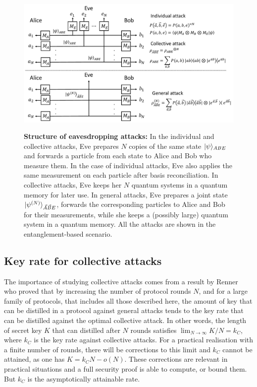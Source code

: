 \documentclass[a4paper]{article}
\begin{document}
\begin{figure}
\begin{center}
  \includegraphics[width=13cm]{attacks.pdf}\\
  \caption{\textbf{Structure of eavesdropping attacks:} In the individual and collective attacks, Eve prepares $N$ copies of the same state $|\psi\rangle_{ABE}$ and forwards a particle from each state to Alice and Bob who measure them. In the case of individual attacks, Eve also applies the same measurement on each particle after basis reconciliation. In collective attacks, Eve keeps her $N$ quantum systems in a quantum memory for later use. In general attacks, Eve prepares a joint state $|\psi^{(N)}\rangle_{\vec A\vec BE}$, forwards the corresponding particles to Alice and Bob for their measurements, while she keeps a (possibly large) quantum system in a quantum memory. All the attacks are shown in the entanglement-based scenario.}\label{attacks}
\end{center}
\end{figure}


\subsection{Key rate for collective attacks} 

The importance of studying collective attacks comes from a result by Renner~\cite{renner} who proved that by increasing the number of protocol rounds $N$, 
and for a large family of protocols, that includes all those described here, the amount of key that can be distilled in a protocol against general attacks tends to the key rate that can be distilled against the optimal collective attack. In other words, the length of secret key $K$ that can distilled after $N$ rounds satisfies $\lim_{N\rightarrow\infty} K/N=k_C$, where $k_C$ is the key rate against collective attacks. For a practical realisation with a finite number of rounds, there will be corrections to this limit and $k_C$ cannot be attained, as one has $K=k_CN-o(N)$. These corrections are relevant in practical situations and a full security proof is able to compute, or bound them. But $k_C$ is the asymptotically attainable rate. 
\end{document}
